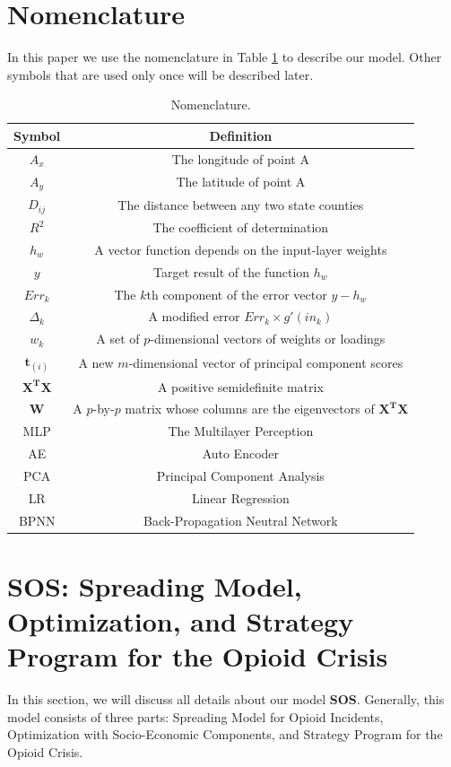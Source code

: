 \documentclass{mcmthesis}
\begin{document}
\section{Nomenclature}\label{Sec-Nomen}  %
In this paper we use the nomenclature in Table \ref{tab:Nomen} to describe our model. Other symbols that are used only once will be described later.
\begin{table}[H]
    \centering
    \caption{Nomenclature.}
    \label{tab:Nomen}
    \begin{tabular}{|c|c|}
\hline
    	Symbol & Definition\\
\hline
	$A_x$ & The longitude of point A\\
	$A_y$ & The latitude of point A \\
    $D_{ij}$ &  The distance between any two state counties\\
    $R^2$ & The coefficient of determination\\
	$h_{w}$ & A vector function depends on the input-layer weights \\
	$y$ & Target result of the function $h_{w}$ \\
	$Err_k$ & The $k$th component of the error vector $y-h_{w}$\\
	$\Delta_k$ &  A modified error $Err _{k}\times g{}'\left ( in_{k} \right )$\\
	$w_{k}$ & A set of $p$-dimensional vectors of weights or loadings\\
	$\mathbf {t} _{(i)}$ & A new $m$-dimensional vector of principal component scores \\
	$\mathbf{X^TX}$ & A positive semidefinite matrix\\
	$\mathbf{W}$ & A $p$-by-$p$ matrix whose columns are the eigenvectors of $\mathbf{X^TX}$\\
    MLP	& The Multilayer Perception\\
    AE	& Auto Encoder\\
    PCA & Principal Component Analysis\\
    LR  & Linear Regression\\
    BPNN & Back-Propagation Neutral Network \\
\hline
    \end{tabular}
\end{table}    

\section{SOS: Spreading Model, Optimization, and Strategy Program for the Opioid Crisis} \label{Sec-Model}
In this section, we will discuss all details about our model \textbf{SOS}. Generally, this model consists of three parts: Spreading Model  for Opioid Incidents, Optimization with Socio-Economic Components, and Strategy Program for the Opioid Crisis.
\end{document}
